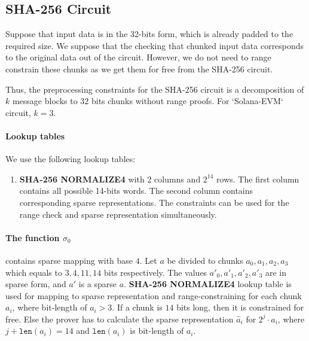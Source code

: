 \subsection{SHA-256 Circuit}
\label{section:sha256}
Suppose that input data is in the 32-bits form, which is already padded to the required size.
We suppose that the checking that chunked input data corresponds to the original data out of the circuit.
However, we do not need to range constrain these chunks as we get them for free from the SHA-256 circuit.


Thus, the preprocessing constraints for the SHA-256 circuit is a decomposition of $k$ message blocks to $32$ bits chunks without range proofs. For `Solana-EVM` circuit, $k = 3$.

\paragraph{Lookup tables}
We use the following lookup tables:
\begin{enumerate}
\item \textbf{SHA-256 NORMALIZE4} with 2 columns and $2^{14}$ rows. 
The first column contains all possible 14-bits words.
The second column contains corresponding sparse representations.
The constraints can be used for the range check and sparse representation simultaneously.
\end{enumerate}

\paragraph{The function $\sigma_0$} contains sparse mapping with base $4$.
Let $a$ be divided to chunks $a_0, a_1, a_2, a_3$ which equals to $3, 4, 11, 14$ bits respectively.
The values $a'_0, a'_1, a'_2, a'_3$ are in sparse form, and $a'$ is a sparse $a$.
\textbf{SHA-256 NORMALIZE4} lookup table is used for mapping to sparse representation and range-constraining for each chunk $a_i$, where bit-length of $a_i > 3$.
If a chunk is $14$ bits long, then it is constrained for free.
Else the prover has to calculate the sparse representation $\hat{a}_i$ for $2^j \cdot a_i$, where $j + \texttt{len}(a_i) = 14$ and $\texttt{len}(a_i)$ is bit-length of $a_i$.

